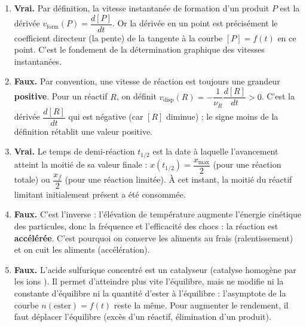 \documentclass[11pt]{article}
\newcommand{\cle}[1]{{\popxbold\color{popdark}#1}}
\begin{document}
\begin{corrige}
\begin{enumerate}
\item \textbf{Vrai.} Par définition, la vitesse instantanée de formation d'un produit $P$ est la dérivée $v_{\text{form}}(P) = \dfrac{d[P]}{dt}$. Or la dérivée en un point est précisément le coefficient directeur (la pente) de la tangente à la courbe $[P] = f(t)$ en ce point. C'est le fondement de la détermination graphique des vitesses instantanées.
\item \textbf{Faux.} Par convention, une vitesse de réaction est toujours une grandeur \textbf{positive}. Pour un réactif $R$, on définit $v_{\text{disp}}(R) = -\dfrac{1}{\nu_R}\dfrac{d[R]}{dt} > 0$. C'est la dérivée $\dfrac{d[R]}{dt}$ qui est négative (car $[R]$ diminue) ; le signe moins de la définition rétablit une valeur positive.
\item \textbf{Vrai.} Le temps de demi-réaction $t_{1/2}$ est la date à laquelle l'avancement atteint la moitié de sa valeur finale : $x(t_{1/2}) = \dfrac{x_{\max}}{2}$ (pour une réaction totale) ou $\dfrac{x_f}{2}$ (pour une réaction limitée). À cet instant, la moitié du réactif limitant initialement présent a été consommée.
\item \textbf{Faux.} C'est l'inverse : l'élévation de température augmente l'énergie cinétique des particules, donc la fréquence et l'efficacité des chocs : la réaction est \textbf{accélérée}. C'est pourquoi on conserve les aliments au frais (ralentissement) et on cuit les aliments (accélération).
\item \textbf{Faux.} L'acide sulfurique concentré est un \cle{catalyseur} (catalyse homogène par les ions ). Il permet d'atteindre plus vite l'équilibre, mais ne modifie ni la constante d'équilibre ni la quantité d'ester à l'équilibre : l'asymptote de la courbe $n(\text{ester}) = f(t)$ reste la même. Pour augmenter le rendement, il faut déplacer l'équilibre (excès d'un réactif, élimination d'un produit).
\end{enumerate}
\end{corrige}
\end{document}
